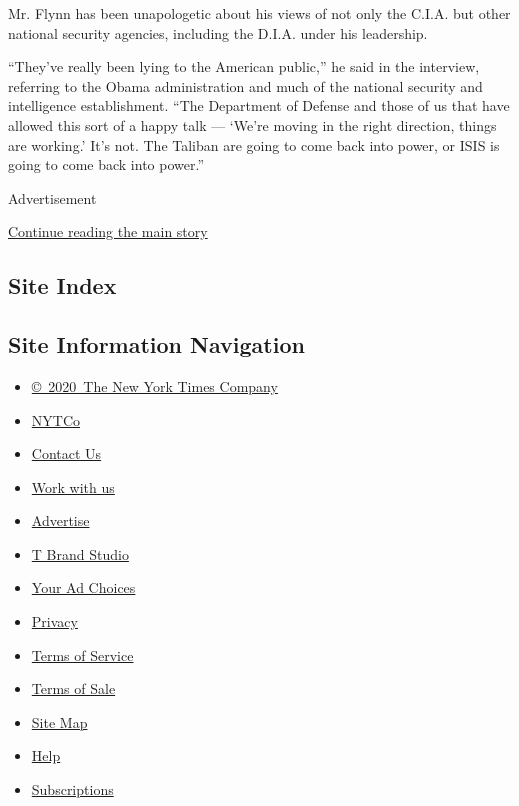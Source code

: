 Mr. Flynn has been unapologetic about his views of not only the C.I.A.
but other national security agencies, including the D.I.A. under his
leadership.

``They've really been lying to the American public,'' he said in the
interview, referring to the Obama administration and much of the
national security and intelligence establishment. ``The Department of
Defense and those of us that have allowed this sort of a happy talk ---
`We're moving in the right direction, things are working.' It's not. The
Taliban are going to come back into power, or ISIS is going to come back
into power.''

Advertisement

\protect\hyperlink{after-bottom}{Continue reading the main story}

\hypertarget{site-index}{%
\subsection{Site Index}\label{site-index}}

\hypertarget{site-information-navigation}{%
\subsection{Site Information
Navigation}\label{site-information-navigation}}

\begin{itemize}
\tightlist
\item
  \href{https://help.nytimes.com/hc/en-us/articles/115014792127-Copyright-notice}{©~2020~The
  New York Times Company}
\end{itemize}

\begin{itemize}
\tightlist
\item
  \href{https://www.nytco.com/}{NYTCo}
\item
  \href{https://help.nytimes.com/hc/en-us/articles/115015385887-Contact-Us}{Contact
  Us}
\item
  \href{https://www.nytco.com/careers/}{Work with us}
\item
  \href{https://nytmediakit.com/}{Advertise}
\item
  \href{http://www.tbrandstudio.com/}{T Brand Studio}
\item
  \href{https://www.nytimes.com/privacy/cookie-policy\#how-do-i-manage-trackers}{Your
  Ad Choices}
\item
  \href{https://www.nytimes.com/privacy}{Privacy}
\item
  \href{https://help.nytimes.com/hc/en-us/articles/115014893428-Terms-of-service}{Terms
  of Service}
\item
  \href{https://help.nytimes.com/hc/en-us/articles/115014893968-Terms-of-sale}{Terms
  of Sale}
\item
  \href{https://spiderbites.nytimes.com}{Site Map}
\item
  \href{https://help.nytimes.com/hc/en-us}{Help}
\item
  \href{https://www.nytimes.com/subscription?campaignId=37WXW}{Subscriptions}
\end{itemize}
